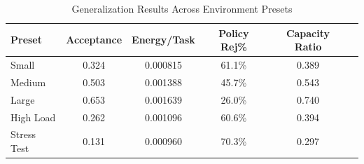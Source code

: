 \begin{table}[h]
\centering
\caption{Generalization Results Across Environment Presets}
\label{tab:generalization}
\begin{tabular}{lccccc}
\toprule
Preset & Acceptance & Energy/Task & Policy Rej\% & Capacity Ratio \\
\midrule
Small & 0.324 & 0.000815 & 61.1\% & 0.389 \\
Medium & 0.503 & 0.001388 & 45.7\% & 0.543 \\
Large & 0.653 & 0.001639 & 26.0\% & 0.740 \\
High Load & 0.262 & 0.001096 & 60.6\% & 0.394 \\
Stress Test & 0.131 & 0.000960 & 70.3\% & 0.297 \\
\bottomrule
\end{tabular}
\end{table}
